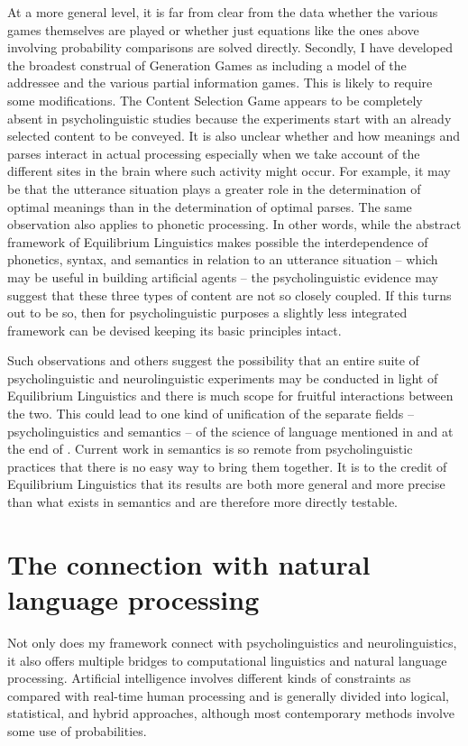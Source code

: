 At a more general level, it is far from clear from the data whether the various games themselves are played or whether just equations like the ones above involving probability comparisons are solved directly. Secondly, I have developed the broadest construal of Generation Games as including a model of the addressee and the various partial information games. This is likely to require some modifications. The Content Selection Game appears to be completely absent in psycholinguistic studies because the experiments start with an already selected content to be conveyed. It is also unclear whether and how meanings and parses interact in actual processing especially when we take account of the different sites in the brain where such activity might occur. For example, it may be that the utterance situation plays a greater role in the determination of optimal meanings than in the determination of optimal parses. The same observation also applies to phonetic processing. In other words, while the abstract framework of Equilibrium Linguistics makes possible the interdependence of phonetics, syntax, and semantics in relation to an utterance situation -- which may be useful in building artificial agents -- the psycholinguistic evidence may suggest that these three types of content are not so closely coupled. If this turns out to be so, then for psycholinguistic purposes a slightly less integrated framework can be devised keeping its basic principles intact.

Such observations and others suggest the possibility that an entire suite of psycholinguistic and neurolinguistic experiments may be conducted in light of Equilibrium Linguistics and there is much scope for fruitful interactions between the two. This could lead to one kind of unification of the separate fields -- psycholinguistics and semantics -- of the science of language mentioned in  and at the end of . Current work in semantics is so remote from psycholinguistic practices that there is no easy way to bring them together. It is to the credit of Equilibrium Linguistics that its results are both more general and more precise than what exists in semantics and are therefore more directly testable.


\section{The connection with natural language processing} \label{sec:cl}

Not only does my framework connect with psycholinguistics and neurolinguistics, it also offers multiple bridges to computational linguistics and natural language processing. Artificial intelligence involves different kinds of constraints as compared with real-time human processing and is generally divided into logical,  statistical, and hybrid approaches, although most contemporary methods involve some use of probabilities.

